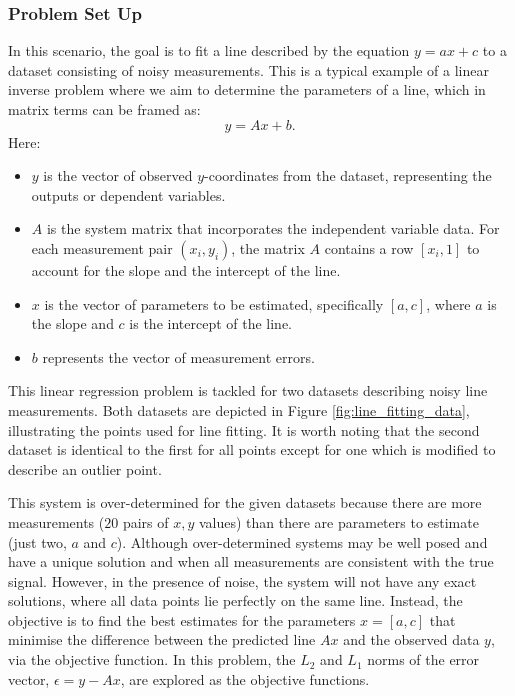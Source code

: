 \documentclass[11pt]{article}
\begin{document}
\subsubsection{Problem Set Up}
In this scenario, the goal is to fit a line described by the equation \( y = ax + c \) to a dataset consisting of noisy measurements. This is a typical example of a linear inverse problem where we aim to determine the parameters of a line, which in matrix terms can be framed as:
\[
y = Ax + b.
\]
Here:
\begin{itemize}
    \item \(y\) is the vector of observed \(y\)-coordinates from the dataset, representing the outputs or dependent variables.
    \item \(A\) is the system matrix that incorporates the independent variable data. For each measurement pair \((x_i, y_i)\), the matrix \(A\) contains a row \([x_i, 1]\) to account for the slope and the intercept of the line.
    \item \(x\) is the vector of parameters to be estimated, specifically \([a, c]\), where \(a\) is the slope and \(c\) is the intercept of the line.
    \item \(b\) represents the vector of measurement errors.
\end{itemize}
This linear regression problem is tackled for two datasets describing noisy line measurements. Both datasets are depicted in Figure \ref{fig:line_fitting_data}, illustrating the points used for line fitting. It is worth noting that the second dataset is identical to the first for all points except for one which is modified to describe an outlier point. 

This system is over-determined for the given datasets because there are more measurements (\(20\) pairs of \(x, y\) values) than there are parameters to estimate (just two, \(a\) and \(c\)). Although over-determined systems may be well posed and have a unique solution and when all measurements are consistent with the true signal. However, in the presence of noise, the system will not have any exact solutions, where all data points lie perfectly on the same line. Instead, the objective is to find the best estimates for the parameters \(x = [a, c]\) that minimise the difference between the predicted line \( Ax \) and the observed data \( y \), via the objective function. In this problem, the \(L_2\) and \(L_1\) norms of the error vector, $\epsilon = y - Ax$, are explored as the objective functions. 
\end{document}
